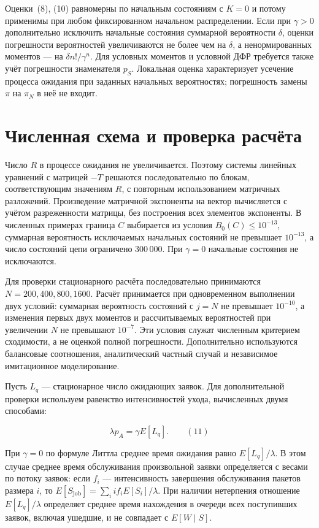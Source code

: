 Оценки~(8), (10) равномерны по начальным состояниям с $K=0$ и потому применимы при любом фиксированном начальном распределении. Если при $\gamma>0$ дополнительно исключить начальные состояния суммарной вероятности $\delta$, оценки погрешности вероятностей увеличиваются не более чем на $\delta$, а ненормированных моментов --- на $\delta n!/\gamma^n$. Для условных моментов и условной ДФР требуется также учёт погрешности знаменателя $p_S$. Локальная оценка характеризует усечение процесса ожидания при заданных начальных вероятностях; погрешность замены $\pi$ на $\pi_N$ в неё не входит.

\section*{Численная схема и проверка расчёта}

Число $R$ в процессе ожидания не увеличивается. Поэтому системы линейных уравнений с матрицей $-T$ решаются последовательно по блокам, соответствующим значениям $R$, с повторным использованием матричных разложений. Произведение матричной экспоненты на вектор вычисляется с учётом разреженности матрицы, без построения всех элементов экспоненты. В численных примерах граница $C$ выбирается из условия $B_0(C)\leq10^{-13}$, суммарная вероятность исключаемых начальных состояний не превышает $10^{-13}$, а число состояний цепи ограничено 300\,000. При $\gamma=0$ начальные состояния не исключаются.

Для проверки стационарного расчёта последовательно принимаются $N=200,400,800,1600$. Расчёт принимается при одновременном выполнении двух условий: суммарная вероятность состояний с $j=N$ не превышает $10^{-10}$, а изменения первых двух моментов и рассчитываемых вероятностей при увеличении $N$ не превышают $10^{-7}$. Эти условия служат численным критерием сходимости, а не оценкой полной погрешности. Дополнительно используются балансовые соотношения, аналитический частный случай и независимое имитационное моделирование.

Пусть $L_q$ --- стационарное число ожидающих заявок. Для дополнительной проверки используем равенство интенсивностей ухода, вычисленных двумя способами:

\[\lambda p_A=\gamma E[L_q].\qquad (11)\]

При $\gamma=0$ по формуле Литтла среднее время ожидания равно $E[L_q]/\lambda$. В этом случае среднее время обслуживания произвольной заявки определяется с весами по потоку заявок: если $f_i$ --- интенсивность завершения обслуживания пакетов размера $i$, то $E[S_{\mathrm{job}}]=\sum_i i f_i E[S_i]/\lambda$. При наличии нетерпения отношение $E[L_q]/\lambda$ определяет среднее время нахождения в очереди всех поступивших заявок, включая ушедшие, и не совпадает с $E[W\mid S]$.

